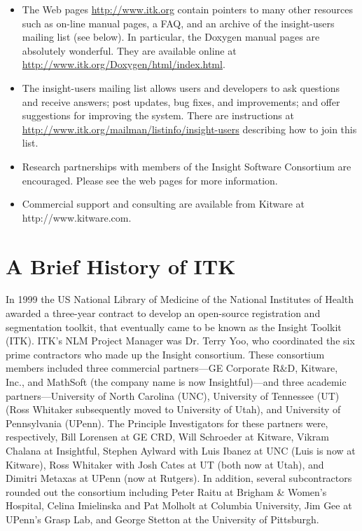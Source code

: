 \begin{itemize}
	\item The Web pages \url{http://www.itk.org} contain pointers to
	many other resources such as on-line manual pages, a FAQ, and an
	archive of the insight-users mailing list (see below). In particular,
	the Doxygen manual pages are absolutely wonderful. They are 
        available online at \url{http://www.itk.org/Doxygen/html/index.html}.

	\item The insight-users mailing list allows users and developers to ask
	questions and receive answers; post updates, bug fixes, and
	improvements; and offer suggestions for improving the system. There
	are instructions at 
        \url{http://www.itk.org/mailman/listinfo/insight-users}
	describing how to join this list.

        \item Research partnerships with members of the Insight Software
        Consortium are encouraged. Please see the web pages for more 
        information.

	\item Commercial support and consulting are available from Kitware at
	http://www.kitware.com. 
\end{itemize}

\section{A Brief History of ITK}
\label{sec:History}


In 1999 the US National Library of Medicine of the National Institutes of
Health awarded a three-year contract to develop an open-source registration
and segmentation toolkit, that eventually came to be known as the Insight
Toolkit (ITK). ITK's NLM Project Manager was Dr. Terry Yoo, who coordinated
the six prime contractors who made up the Insight consortium. These
consortium members included three commercial partners---GE Corporate R\&D,
Kitware, Inc., and MathSoft (the company name is now Insightful)---and three
academic partners---University of North Carolina (UNC), University of
Tennessee (UT) (Ross Whitaker subsequently moved to University of Utah), and
University of Pennsylvania (UPenn). The Principle Investigators for these
partners were, respectively, Bill Lorensen at GE CRD, Will Schroeder at
Kitware, Vikram Chalana at Insightful, Stephen Aylward with Luis Ibanez at
UNC (Luis is now at Kitware), Ross Whitaker with Josh Cates at UT (both now
at Utah), and Dimitri Metaxas at UPenn (now at Rutgers). In addition, several
subcontractors rounded out the consortium including Peter Raitu at Brigham \&
Women's Hospital, Celina Imielinska and Pat Molholt at Columbia University,
Jim Gee at UPenn's Grasp Lab, and George Stetton at the University of
Pittsburgh.

